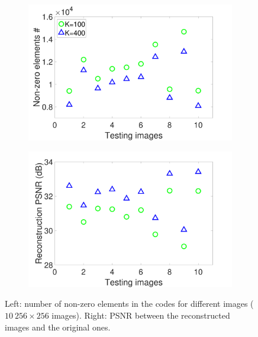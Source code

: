 \documentclass[10pt,twocolumn,letterpaper]{article}
\begin{document}
\begin{figure}[h]
\centering
\begin{subfigure}{0.49\textwidth}
  \includegraphics[width=1\linewidth]{figure/nonZeroElement.pdf}
\end{subfigure}
\begin{subfigure}{0.49\textwidth}
  \includegraphics[width=1\linewidth]{figure/reconPSNR.pdf}
\end{subfigure}

\caption{Left: number of non-zero elements in the codes for different images ($10 ~ 256 \times 256$ images). Right: PSNR between the reconstructed images and the original ones.}
\label{fig:overVSunder}
\end{figure}
\end{document}
